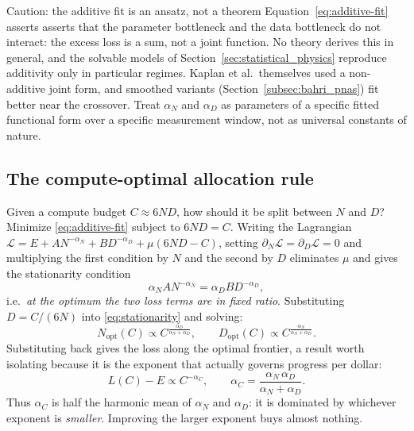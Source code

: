 \documentclass[11pt,a4paper]{article}
\theoremstyle{definition}
\begin{document}
\begin{caution}{Caution: the additive fit is an ansatz, not a theorem}
Equation~\eqref{eq:additive-fit} asserts asserts that the parameter bottleneck and the data bottleneck do not interact: the excess loss is a sum, not a joint function. No theory derives this in general, and the solvable models of Section~\ref{sec:statistical_physics} reproduce additivity only in particular regimes. Kaplan et al.\ themselves used a non-additive joint form, and smoothed variants (Section~\ref{subsec:bahri_pnas}) fit better near the crossover. Treat $\alpha_N$ and $\alpha_D$ as parameters of a specific fitted functional form over a specific measurement window, not as universal constants of nature.
\end{caution}

\subsection{The compute-optimal allocation rule}
\label{subsec:chinchilla}

Given a compute budget $C\approx 6ND$, how should it be split between $N$ and $D$? Minimize \eqref{eq:additive-fit} subject to $6ND=C$. Writing the Lagrangian $\mathcal{L} = E + AN^{-\alpha_N} + BD^{-\alpha_D} + \mu(6ND - C)$, setting $\partial_N\mathcal{L}=\partial_D\mathcal{L}=0$ and multiplying the first condition by $N$ and the second by $D$ eliminates $\mu$ and gives the stationarity condition
\begin{equation}
  \alpha_N A N^{-\alpha_N} = \alpha_D B D^{-\alpha_D},
  \label{eq:stationarity}
\end{equation}
i.e.\ \emph{at the optimum the two loss terms are in fixed ratio}. Substituting $D = C/(6N)$ into \eqref{eq:stationarity} and solving:
\begin{equation}
  \boxed{N_{\mathrm{opt}}(C) \propto C^{\frac{\alpha_D}{\alpha_N + \alpha_D}}, \qquad D_{\mathrm{opt}}(C) \propto C^{\frac{\alpha_N}{\alpha_N + \alpha_D}}}.
  \label{eq:chinchilla-allocation}
\end{equation}
Substituting back gives the loss along the optimal frontier, a result worth isolating because it is the exponent that actually governs progress per dollar:
\begin{equation}
  \boxed{L(C) - E \propto C^{-\alpha_C}, \qquad \alpha_C = \frac{\alpha_N\,\alpha_D}{\alpha_N + \alpha_D}}.
  \label{eq:compute-exponent}
\end{equation}
Thus $\alpha_C$ is half the harmonic mean of $\alpha_N$ and $\alpha_D$: it is dominated by whichever exponent is \emph{smaller}. Improving the larger exponent buys almost nothing.
\end{document}
